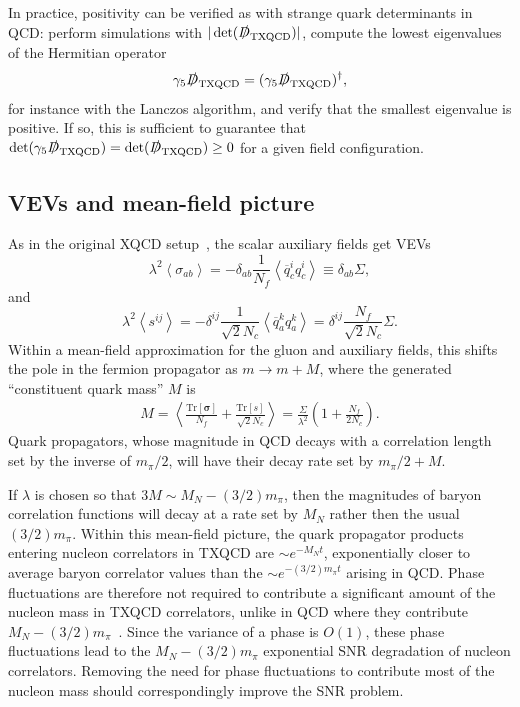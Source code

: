 \documentclass[%
    twocolumn,
superscriptaddress,
preprintnumbers,
nofootinbib,
 amsmath,amssymb,
 aps,
 prd,
 floatfix,
]{revtex4-2}
\newcommand{\txqcd}[0]{\text{TXQCD}}
\begin{document}
In practice, positivity can be verified as with strange quark determinants in QCD: perform simulations with $|\det(\slashed{D}_{\txqcd})|$, compute the lowest eigenvalues of the Hermitian operator
\begin{equation}
    \gamma_5 \slashed{D}_{\txqcd} = ( \gamma_5 \slashed{D}_{\txqcd})^\dagger, 
\end{equation}
for instance with the Lanczos algorithm,
and verify that the smallest eigenvalue is positive.
If so, this is sufficient to guarantee that $\det(\gamma_5 \slashed{D}_{\txqcd}) = \det( \slashed{D}_{\txqcd}) \geq 0$ for a given field configuration.


\subsection{VEVs and mean-field picture}

As in the original XQCD setup~\cite{Kaplan:2013dca}, the scalar auxiliary fields get VEVs
\begin{equation}
    \lambda^2 \left< \sigma_{ab} \right> = -\delta_{ab} \frac{1}{N_f} \left< \overline{q}^i_c q^i_c \right> \equiv \delta_{ab} \Sigma,
\end{equation}
and
\begin{equation}
    \lambda^2 \left< s^{ij} \right> = -\delta^{ij} \frac{1}{\sqrt{2} N_c} \left< \overline{q}^k_a q^k_a \right> = \delta^{ij} \frac{N_f}{\sqrt{2} N_c} \Sigma.
\end{equation}
Within a mean-field approximation for the gluon and auxiliary fields, this shifts the pole in the fermion propagator as $m \rightarrow m + M$, where the generated ``constituent quark mass'' $M$ is
\begin{equation}\label{eq:M_Sigma}
\begin{split}
    M =  \left< \frac{\text{Tr}[\bm{\sigma}]}{N_f}   + \frac{\text{Tr}[s]}{\sqrt{2} N_c}  \right>  = \frac{\Sigma}{\lambda^2}\left( 1 + \frac{N_f}{2N_c} \right).
    \end{split}
\end{equation}
Quark propagators, whose magnitude in QCD decays with a correlation length set by the inverse of $m_\pi /2$, will have their decay rate set by $m_\pi/2 + M$. 

If $\lambda$ is chosen so that $3M \sim M_N - (3/2) m_\pi$, then the magnitudes of baryon correlation functions will decay at a rate set by $M_N$ rather then the usual $(3/2)m_\pi$.
Within this mean-field picture, the quark propagator products entering nucleon correlators in TXQCD are $\sim e^{-M_N t}$, exponentially closer to average baryon correlator values than the $\sim e^{-(3/2)m_\pi t}$ arising in QCD.
Phase fluctuations are therefore not required to contribute a significant amount of the nucleon mass in TXQCD correlators, unlike in QCD where they contribute $M_N - (3/2)m_\pi$~\cite{Wagman:2016bam}.
Since the variance of a phase is $O(1)$, these phase fluctuations lead to the $M_N - (3/2)m_\pi$ exponential SNR degradation of nucleon correlators.
Removing the need for phase fluctuations to contribute most of the nucleon mass should correspondingly improve the SNR problem.
\end{document}
